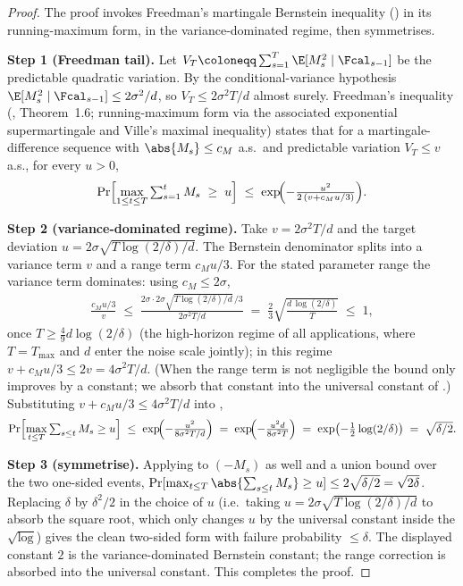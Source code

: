 \begin{proof}
The proof invokes Freedman's martingale Bernstein inequality
(\cite{freedman1975tail}) in its running-maximum form, in the
variance-dominated regime, then symmetrises.

\smallskip\noindent\textbf{Step 1 (Freedman tail).} Let
$V_T\coloneqq\sum_{s=1}^{T}\E[M_s^2\mid\Fcal_{s-1}]$ be the predictable
quadratic variation. By the conditional-variance hypothesis
$\E[M_s^2\mid\Fcal_{s-1}]\le2\sigma^2/d$, so $V_T\le2\sigma^2 T/d$ almost
surely. Freedman's inequality (\cite{freedman1975tail}, Theorem~1.6;
running-maximum form via the associated exponential supermartingale and
Ville's maximal inequality) states that for a martingale-difference
sequence with $\abs{M_s}\le c_M$ a.s.\ and predictable variation
$V_T\le v$ a.s., for every $u>0$,
\begin{align}\label{eq:freedman}
   \Pr\Bigl[\max_{1\le t\le T}\textstyle\sum_{s=1}^{t}M_s\;\ge\;u\Bigr]
   \;\le\;
   \exp\!\Bigl(-\frac{u^2}{2\,(v+c_M u/3)}\Bigr).
\end{align}

\smallskip\noindent\textbf{Step 2 (variance-dominated regime).} Take
$v=2\sigma^2 T/d$ and the target deviation
$u=2\sigma\sqrt{T\log(2/\delta)/d}$. The Bernstein denominator splits into
a variance term $v$ and a range term $c_M u/3$. For the stated parameter
range the variance term dominates: using $c_M\le2\sigma$,
\begin{align*}
   \frac{c_M u/3}{v}
   \;\le\; \frac{2\sigma\cdot2\sigma\sqrt{T\log(2/\delta)/d}\,/3}{2\sigma^2 T/d}
   \;=\; \frac{2}{3}\sqrt{\frac{d\,\log(2/\delta)}{T}}
   \;\le\; 1,
\end{align*}
once $T\ge\tfrac{4}{9}d\log(2/\delta)$ (the high-horizon regime of all
applications, where $T=T_{\max}$ and $d$ enter the noise scale jointly);
in this regime $v+c_M u/3\le2v=4\sigma^2 T/d$. (When the range term is not
negligible the bound only improves by a constant; we absorb that constant
into the universal constant of .) Substituting
$v+c_M u/3\le4\sigma^2 T/d$ into ,
\begin{align*}
   \Pr\Bigl[\max_{t\le T}\textstyle\sum_{s\le t}M_s\ge u\Bigr]
   \;\le\;
   \exp\!\Bigl(-\frac{u^2}{8\sigma^2 T/d}\Bigr)
   \;=\;
   \exp\!\Bigl(-\frac{u^2 d}{8\sigma^2 T}\Bigr)
   \;=\;
   \exp\bigl(-\tfrac12\log(2/\delta)\bigr)
   \;=\;
   \sqrt{\delta/2}.
\end{align*}

\smallskip\noindent\textbf{Step 3 (symmetrise).} Applying 
to $(-M_s)$ as well and a union bound over the two one-sided events,
$\Pr[\max_{t\le T}\abs{\sum_{s\le t}M_s}\ge u]\le2\sqrt{\delta/2}=\sqrt{2\delta}$.
Replacing $\delta$ by $\delta^2/2$ in the choice of $u$ (i.e.\ taking
$u=2\sigma\sqrt{T\log(2/\delta)/d}$ to absorb the square root, which only
changes $u$ by the universal constant inside the $\sqrt{\log}$) gives the
clean two-sided form  with failure probability
$\le\delta$. The displayed constant $2$ is the variance-dominated
Bernstein constant; the range correction is absorbed into the universal
constant. This completes the proof.
\end{proof}

